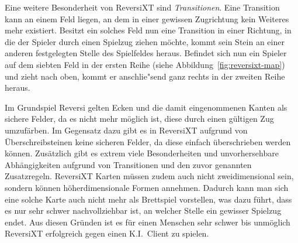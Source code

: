 Eine weitere Besonderheit von ReversiXT sind \emph{Transitionen}.
Eine Transition kann an einem Feld liegen, an dem in einer gewissen Zugrichtung kein Weiteres mehr existiert.
Besitzt ein solches Feld nun eine Transition in einer Richtung, in die der Spieler durch einen Spielzug ziehen m\"ochte, kommt sein Stein an einer anderen festgelegten Stelle des Spielfeldes heraus.
Befindet sich nun ein Spieler auf dem siebten Feld in der ersten Reihe (siehe Abbildung~\ref{fig:reversixt-map}) und zieht nach oben, kommt er anschlie"send ganz rechts in der zweiten Reihe heraus.

Im Grundspiel Reversi gelten Ecken und die damit eingenommenen Kanten als sichere Felder, da es nicht mehr m\"oglich ist, diese durch einen g\"ultigen Zug umzuf\"arben.
Im Gegensatz dazu gibt es in ReversiXT aufgrund von \"Uberschreibsteinen keine sicheren Felder, da diese einfach \"uberschrieben werden k\"onnen.
Zus\"atzlich gibt es extrem viele Besonderheiten und unvorhersehbare Abh\"angigkeiten aufgrund von Transitionen und den zuvor genannten Zusatzregeln.
ReversiXT Karten m\"ussen zudem auch nicht zweidimensional sein, sondern k\"onnen h\"oherdimensionale Formen annehmen.
Dadurch kann man sich eine solche Karte auch nicht mehr als Brettspiel vorstellen, was dazu f\"uhrt, dass es nur sehr schwer nachvollziehbar ist, an welcher Stelle ein gewisser Spielzug endet.
Aus diesen Gr\"unden ist es f\"ur einen Menschen sehr schwer bis unm\"oglich ReversiXT erfolgreich gegen einen K.I.\ Client zu spielen.

